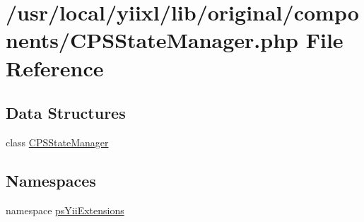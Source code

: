 \hypertarget{CPSStateManager_8php}{
\section{/usr/local/yiixl/lib/original/components/CPSStateManager.php File Reference}
\label{CPSStateManager_8php}
}
\subsection*{Data Structures}
\begin{DoxyCompactItemize}
\item 
class \hyperlink{classCPSStateManager}{CPSStateManager}
\end{DoxyCompactItemize}
\subsection*{Namespaces}
\begin{DoxyCompactItemize}
\item 
namespace \hyperlink{namespacepsYiiExtensions}{psYiiExtensions}
\end{DoxyCompactItemize}
